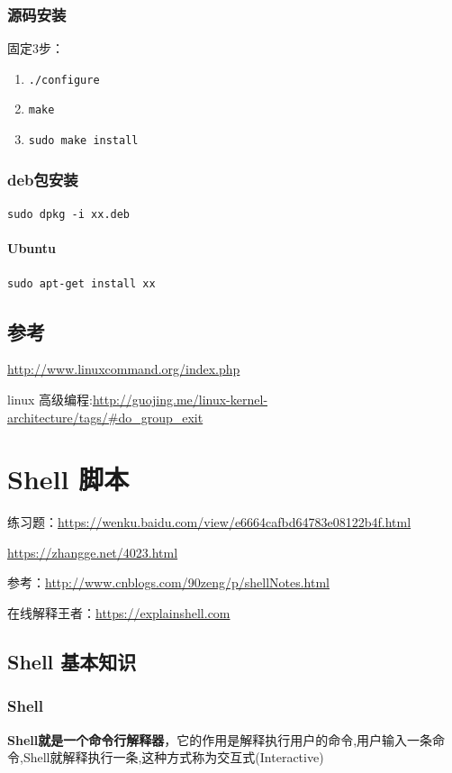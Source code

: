 \documentclass[UTF8,a4paper,12pt]{ctexbook}
\begin{document}
		\subsection{源码安装}
			固定3步：
			
			\begin{enumerate}
				\item \verb|./configure|
				\item \verb|make|
				\item \verb|sudo make install|
			\end{enumerate}
	
		\subsection{deb包安装}
			\verb|sudo dpkg -i xx.deb|
			
			\subsubsection{Ubuntu} \verb|sudo apt-get install xx|
			
	\section{参考}
		\url{http://www.linuxcommand.org/index.php}
		
		linux 高级编程:\url{http://guojing.me/linux-kernel-architecture/tags/#do_group_exit}
			
 \chapter{Shell 脚本}
	 练习题：\url{https://wenku.baidu.com/view/e6664cafbd64783e08122b4f.html}
	 
		 \url{https://zhangge.net/4023.html}
		 
		 参考：\url{http://www.cnblogs.com/90zeng/p/shellNotes.html}
		 
	在线解释王者：\url{https://explainshell.com}
	 \section{Shell 基本知识}
		 \subsection{Shell}
			 \textbf{Shell就是一个命令行解释器}，它的作用是解释执行用户的命令,用户输入一条命令,Shell就解释执行一条,这种方式称为交互式(Interactive)
			 
\end{document}
